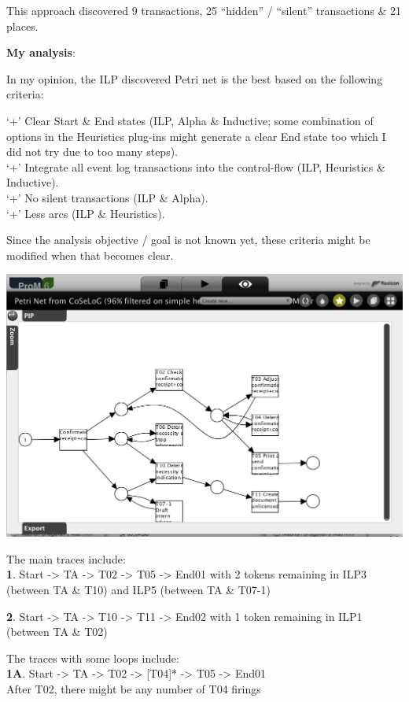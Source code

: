 \documentclass[]{article}
\begin{document}
This approach discovered 9 transactions, 25 ``hidden'' / ``silent''
transactions \& 21 places.

\textbf{My analysis}:

In my opinion, the ILP discovered Petri net is the best based on the
following criteria:

`+' Clear Start \& End states (ILP, Alpha \& Inductive; some combination
of options in the Heuristics plug-ins might generate a clear End state
too which I did not try due to too many steps).\\`+' Integrate all event
log transactions into the control-flow (ILP, Heuristics \&
Inductive).\\`+' No silent transactions (ILP \& Alpha).\\`+' Less arcs
(ILP \& Heuristics).

Since the analysis objective / goal is not known yet, these criteria
might be modified when that becomes clear.

\includegraphics{CoSeLoG_Step_05_Filter96_PetriNet_ILP.png}

The main traces include:\\\textbf{1}. Start -\textgreater{} TA
-\textgreater{} T02 -\textgreater{} T05 -\textgreater{} End01 with 2
tokens remaining in ILP3 (between TA \& T10) and ILP5 (between TA \&
T07-1)

\textbf{2}. Start -\textgreater{} TA -\textgreater{} T10 -\textgreater{}
T11 -\textgreater{} End02 with 1 token remaining in ILP1 (between TA \&
T02)

The traces with some loops include:\\\textbf{1A}. Start -\textgreater{}
TA -\textgreater{} T02 -\textgreater{} {[}T04{]}* -\textgreater{} T05
-\textgreater{} End01\\ After T02, there might be any number of T04
firings
\end{document}
